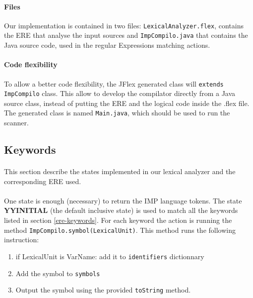 \documentclass[letterpaper]{article}
\begin{document}
\paragraph{Files}

Our implementation is contained in two files: \texttt{LexicalAnalyzer.flex},
contains the ERE that analyse the input sources and \texttt{ImpCompilo.java}
that contains the Java source code, used in the regular Expressions
matching actions.


\paragraph{Code flexibility}

To allow a better code flexibility, the JFlex generated class will
\texttt{extends} \texttt{ImpCompilo} class. This allow to develop the
compilator directly from a Java source class, instead of putting the
ERE and the logical code inside the .flex file. The generated class is named
\texttt{Main.java}, which should be used to run the scanner.

\subsection{Keywords}

\paragraph{}

This section describe the states\cite{jflexdocstates} implemented in our
lexical analyzer and the corresponding ERE used.

\paragraph{}

One state is enough (necessary) to return the IMP language tokens.
The state \textbf{YYINITIAL} (the default inclusive state) is used to match
all the keywords listed in section \ref{ere-keywords}. For each keyword
the action is running the method \texttt{ImpCompilo.symbol(LexicalUnit)}.
This method runs the following instruction:
\begin{enumerate}
    \item if LexicalUnit is VarName: add it to \texttt{identifiers} dictionnary
    \item Add the symbol to \texttt{symbols}
    \item Output the symbol using the provided \texttt{toString} method.
\end{enumerate}
\end{document}

